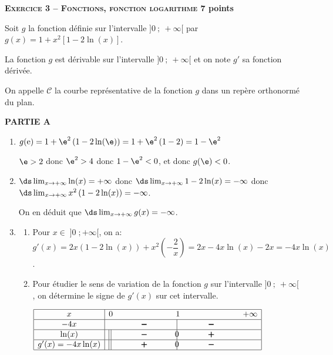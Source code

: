 \textbf{\Large\textsc{Exercice 3 -- Fonctions, fonction logarithme} \hfill 7 points}

\medskip

Soit $g$ la fonction définie sur l'intervalle $]0~;~+\infty[$ par 
$g(x) = 1+ x^2[1 - 2 \ln (x)].$

La fonction $g$ est dérivable sur l'intervalle $]0~;~+\infty[$ et on note $g'$ sa fonction dérivée.

On appelle $\mathcal{C}$ la courbe représentative de la fonction $g$ dans un repère orthonormé du plan.

\medskip

\textbf{PARTIE A}


\begin{enumerate}
\item $g(\text{e}) = 1+\e^2\left (1-2\ln(\e)\right ) = 1+\e^2\left (1-2\right ) 
=1-\e^2$

$\e>2$ donc $\e^2>4$ donc $1-\e^2<0$, et donc $g(\e)<0$.

\item %
$\ds\lim_{x \to +\infty} \ln(x)=+\infty$ donc $\ds\lim_{x \to +\infty} 1-2\ln(x) = -\infty$ donc $\ds\lim_{x \to +\infty} x^2\left (1-2\ln(x)\right )=-\infty$.

On en déduit que $\ds\lim_{x \to + \infty} g(x) = - \infty$.

\item 
	\begin{enumerate}
		\item %
Pour $x\in\;]0\;; +\infty[$, on a:	\\
$g'(x)=2x\left (1-2\ln(x)\right ) + x^2\left (-\dfrac{2}{x}\right )
= 2x -4x\ln(x) -2x=-4x\ln(x)$.	
		
		\item Pour étudier le sens de variation de la fonction $g$ sur l'intervalle $]0~;~+\infty[$, on détermine le signe de $g'(x)$ sur cet intervalle.
		
\begin{center}
{\renewcommand{\arraystretch}{1.5}
\def\esp{\hspace*{2cm}}
$\begin{array}{|c | l*{4}{c} |} 
\hline
x  & 0 & \esp & 1 & \esp  & +\infty \\
\hline
-4x &  & \pmb{-} &  \vline\hspace{-2.7pt}{\phantom 0} & \pmb{-} &   \\
\hline
\ln(x) &\vline\:\vline  & \pmb{-} &  \vline\hspace{-2.7pt}{0} & \pmb{+} &   \\
\hline
g'(x)=-4x\ln(x) & \vline\:\vline & \pmb{+} &  \vline\hspace{-2.7pt}{0} & \pmb{-} &   \\
\hline
\end{array}$
}
\end{center}
		

\end{enumerate}
\end{enumerate}
